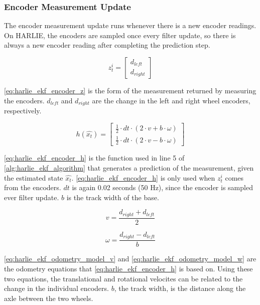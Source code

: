 \subsubsection{Encoder Measurement Update}\label{subsubsec:harlie_ekf_encoder_measurement}

The encoder measurement update runs whenever there is a new encoder readings. On HARLIE, the encoders are sampled once every filter update, so there is always a new encoder reading after completing the prediction step.

\begin{equation}
	z_t^i = 
	\begin{bmatrix}
		d_{left} \\
		d_{right}
	\end{bmatrix}
	\label{eq:harlie_ekf_encoder_z}
\end{equation}

\eqref{eq:harlie_ekf_encoder_z} is the form of the measurement returned by measuring the encoders. $d_{left}$ and $d_{right}$ are the change in the left and right wheel encoders, respectively.

\begin{equation}
	h\left(\hat{x_t}\right) =
	\begin{bmatrix}
		\frac{1}{2} \cdot dt \cdot \left( 2 \cdot v + b \cdot \omega \right) \\
		\frac{1}{2} \cdot dt \cdot \left( 2 \cdot v - b \cdot \omega \right) 
	\end{bmatrix}
	\label{eq:harlie_ekf_encoder_h}
\end{equation}

\eqref{eq:harlie_ekf_encoder_h} is the function used in line 5 of \autoref{alg:harlie_ekf_algorithm} that generates a prediction of the measurement, given the estimated state $\hat{x_t}$. \eqref{eq:harlie_ekf_encoder_h} is only used when $z_t^i$ comes from the encoders. $dt$ is again 0.02 seconds (50 Hz), since the encoder is sampled ever filter update. $b$ is the track width of the base. 

\begin{equation}
	v = \frac{d_{right}+d_{left}}{2}
	\label{eq:harlie_ekf_odometry_model_v}
\end{equation}

\begin{equation}
	\omega = \frac{d_{right} - d_{left}}{b}
	\label{eq:harlie_ekf_odometry_model_w}
\end{equation}

\eqref{eq:harlie_ekf_odometry_model_v} and \eqref{eq:harlie_ekf_odometry_model_w} are the odometry equations that \eqref{eq:harlie_ekf_encoder_h} is based on. Using these two equations, the translational and rotational velocites can be related to the change in the individual encoders. $b$, the track width, is the distance along the axle between the two wheels. 

